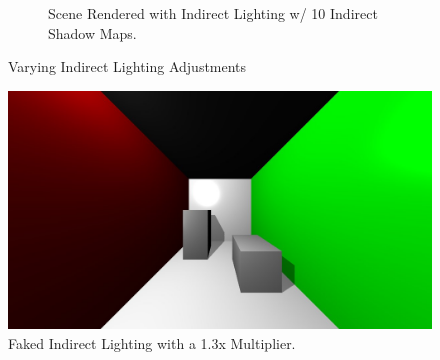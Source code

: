 \begin{figure}
\begin{subfigure}[b]{0.75\textwidth}
                \caption{Scene Rendered with Indirect Lighting w/ 10 Indirect Shadow Maps.}
                \label{fig:10indSM}
        \end{subfigure}
        \caption{Varying Indirect Lighting Adjustments} \label{fig:indirectimages}
\end{figure}


\begin{figure}[h!]
  \centering
    \includegraphics[width=1.0\textwidth]{direct_only_fake_1_3.jpg}
  \caption{Faked Indirect Lighting with a 1.3x Multiplier.}
	\label{fig:fakedindirect}
\end{figure}


